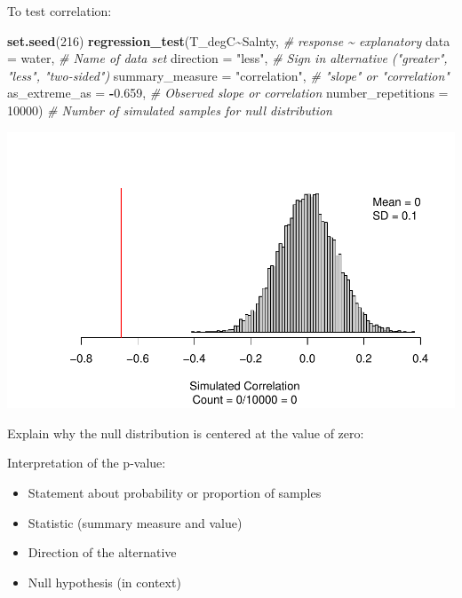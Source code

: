 \documentclass[
]{report}
\newenvironment{Shaded}{\begin{snugshade}}{\end{snugshade}}
\newcommand{\AttributeTok}[1]{\textcolor[rgb]{0.13,0.29,0.53}{#1}}
\newcommand{\CommentTok}[1]{\textcolor[rgb]{0.56,0.35,0.01}{\textit{#1}}}
\newcommand{\DecValTok}[1]{\textcolor[rgb]{0.00,0.00,0.81}{#1}}
\newcommand{\FloatTok}[1]{\textcolor[rgb]{0.00,0.00,0.81}{#1}}
\newcommand{\FunctionTok}[1]{\textcolor[rgb]{0.13,0.29,0.53}{\textbf{#1}}}
\newcommand{\NormalTok}[1]{#1}
\newcommand{\SpecialCharTok}[1]{\textcolor[rgb]{0.81,0.36,0.00}{\textbf{#1}}}
\newcommand{\StringTok}[1]{\textcolor[rgb]{0.31,0.60,0.02}{#1}}
\begin{document}
\newpage

To test correlation:

\begin{Shaded}
\begin{Highlighting}[]
\FunctionTok{set.seed}\NormalTok{(}\DecValTok{216}\NormalTok{)}
\FunctionTok{regression\_test}\NormalTok{(T\_degC}\SpecialCharTok{\textasciitilde{}}\NormalTok{Salnty, }\CommentTok{\# response \textasciitilde{} explanatory}
               \AttributeTok{data =}\NormalTok{ water, }\CommentTok{\# Name of data set}
               \AttributeTok{direction =} \StringTok{"less"}\NormalTok{, }\CommentTok{\# Sign in alternative ("greater", "less", "two{-}sided")}
               \AttributeTok{summary\_measure =} \StringTok{"correlation"}\NormalTok{, }\CommentTok{\# "slope" or "correlation"}
               \AttributeTok{as\_extreme\_as =} \SpecialCharTok{{-}}\FloatTok{0.659}\NormalTok{, }\CommentTok{\# Observed slope or correlation}
               \AttributeTok{number\_repetitions =} \DecValTok{10000}\NormalTok{) }\CommentTok{\# Number of simulated samples for null distribution}
\end{Highlighting}
\end{Shaded}

\begin{center}\includegraphics[width=0.7\linewidth]{13-VN13-regression_files/figure-latex/unnamed-chunk-14-1} \end{center}

Explain why the null distribution is centered at the value of zero:

\vspace{0.5in}

Interpretation of the p-value:

\begin{itemize}
\item
  Statement about probability or proportion of samples
\item
  Statistic (summary measure and value)
\item
  Direction of the alternative
\item
  Null hypothesis (in context)
\end{itemize}
\end{document}
